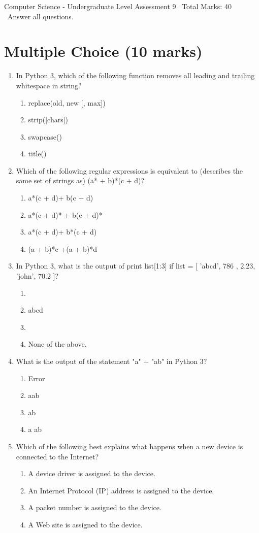 \documentclass[12pt]{article}
\begin{document}
\begin{center}
Computer Science - Undergraduate Level Assessment 9 \
Total Marks: 40 \
Answer all questions.
\end{center}

\section*{Multiple Choice (10 marks)}
\begin{enumerate}[label=\arabic*.]
\item In Python 3, which of the following function removes all leading and trailing whitespace in string?
\begin{enumerate}[label=(\alph*)]
    \item replace(old, new [, max])
    \item strip([chars])
    \item swapcase()
    \item title()
\end{enumerate}
\item Which of the following regular expressions is equivalent to (describes the same set of strings as) (a* + b)*(c + d)?
\begin{enumerate}[label=(\alph*)]
    \item a*(c + d)+ b(c + d)
    \item a*(c + d)* + b(c + d)*
    \item a*(c + d)+ b*(c + d)
    \item (a + b)*c +(a + b)*d
\end{enumerate}
\item In Python 3, what is the output of print list[1:3] if list = [ 'abcd', 786 , 2.23, 'john', 70.2 ]?
\begin{enumerate}[label=(\alph*)]
    \item [ 'abcd', 786 , 2.23, 'john', 70.2 ]
    \item abcd
    \item [786, 2.23]
    \item None of the above.
\end{enumerate}
\item What is the output of the statement "a" + "ab" in Python 3?
\begin{enumerate}[label=(\alph*)]
    \item Error
    \item aab
    \item ab
    \item a ab
\end{enumerate}
\item Which of the following best explains what happens when a new device is connected to the Internet?
\begin{enumerate}[label=(\alph*)]
    \item A device driver is assigned to the device.
    \item An Internet Protocol (IP) address is assigned to the device.
    \item A packet number is assigned to the device.
    \item A Web site is assigned to the device.
\end{enumerate}
\end{enumerate}
\end{document}
